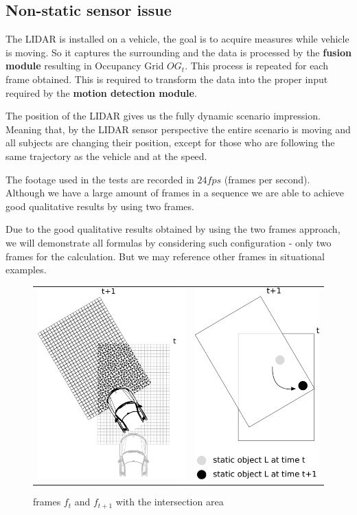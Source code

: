 \subsection{Non-static sensor issue}

The LIDAR is installed on a vehicle, the goal is to acquire measures while vehicle is moving. So it captures the surrounding and the data is processed by the \textbf{fusion module} resulting in Occupancy Grid $OG_t$. This process is repeated for each frame obtained. This is required to transform the data into the proper input required by the \textbf{motion detection module}.

The position of the LIDAR gives us the fully dynamic scenario impression. Meaning that, by the LIDAR sensor perspective the entire scenario is moving and all subjects are changing their position, except for those who are following the same trajectory as the vehicle and at the speed. 

The footage used in the tests are recorded in $24fps$ (frames per second). Although we have a large amount of frames in a sequence we are able to achieve good qualitative results by using two frames. 

Due to the good qualitative results obtained by using the two frames approach, we will demonstrate all formulas by considering such configuration - only two frames for the calculation. But we may reference other frames in situational examples.


\begin{figure}[h]
   \centering
     \begin{tabular}{lr}
       \includegraphics[width=0.35\columnwidth]{img/fig:motion:algorithm:nonstatic:01}
       & \includegraphics[width=0.3\columnwidth]{img/fig:motion:algorithm:nonstatic:02}
     \end{tabular}
   \caption{frames $f_t$ and $f_{t+1}$ with the intersection area}
   \label{fig:motion:algorithm:nonstatic:01}
 \end{figure}

